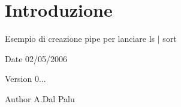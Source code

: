 \hypertarget{index_intro}{}\section{Introduzione}\label{index_intro}
Esempio di creazione pipe per lanciare ls $\vert$ sort~\newline
 \begin{DoxyDate}{Date}
02/05/2006 
\end{DoxyDate}
\begin{DoxyVersion}{Version}
0... 
\end{DoxyVersion}
\begin{DoxyAuthor}{Author}
A.\+Dal Palu 
\end{DoxyAuthor}
